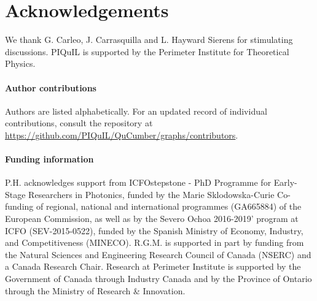 \documentclass[submission, Phys]{SciPost}
\begin{document}
\section*{Acknowledgements}
We thank G. Carleo, J. Carrasquilla and L. Hayward Sierens for stimulating discussions.
PIQuIL is supported by the Perimeter Institute for Theoretical Physics.

\paragraph{Author contributions}
Authors are listed alphabetically. For an updated record of individual contributions, consult the repository at \url{https://github.com/PIQuIL/QuCumber/graphs/contributors}.

\paragraph{Funding information}
P.H. acknowledges support from ICFOstepstone - PhD Programme for Early-Stage Researchers in Photonics, funded by the Marie Sklodowska-Curie Co-funding of regional, national and international programmes (GA665884) of the European Commission, as well as by the Severo Ochoa 2016-2019' program at ICFO (SEV-2015-0522), funded by the Spanish Ministry of Economy, Industry, and Competitiveness (MINECO).
R.G.M. is supported in part by funding from the Natural Sciences and Engineering Research Council of Canada (NSERC) and a Canada Research Chair.
Research at Perimeter Institute is supported by the Government of Canada through Industry Canada and by the Province of Ontario through the Ministry of Research \& Innovation.
\end{document}
